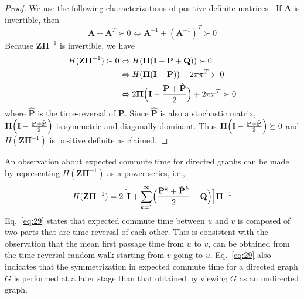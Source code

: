 \documentclass[10pt,twocolumn]{article}
\numberwithin{equation}{section}
\begin{document}
\begin{proof}
  We use the
  following characterizations of positive definite matrices
  \cite{boley09:_gener_laplac,horn94:_topic_in_matrix_analy}. If
  $\mathbf{A}$ is invertible, then
  \begin{equation}
    \label{eq:28}
    \mathbf{A} + \mathbf{A}^{T} \succ 0 \Leftrightarrow
    \mathbf{A}^{-1} + (\mathbf{A}^{-1})^{T} \succ 0
  \end{equation}
  Because $\mathbf{Z}\bm{\Pi}^{-1}$ is invertible, we have
  \begin{equation*}
    \begin{split}
      H(\mathbf{Z}\bm{\Pi}^{-1}) \succ 0
      & \Leftrightarrow H(\bm{\Pi}(\mathbf{I} - \mathbf{P} + \mathbf{Q})) \succ 0  \\
      & \Leftrightarrow H(\bm{\Pi}(\mathbf{I} - \mathbf{P})) + 2 \pi \pi^{T} \succ 0 \\
      & \Leftrightarrow 2 \bm{\Pi}\Bigl(\mathbf{I} - \frac{\mathbf{P}
        + \hat{\mathbf{P}}}{2}\Bigr) + 2\pi\pi^{T} \succ 0
   \end{split}
  \end{equation*}
  where $\hat{\mathbf{P}}$ is the time-reversal of $\mathbf{P}$. Since
  $\hat{\mathbf{P}}$ is also a stochastic matrix,
  $\bm{\Pi}\Bigl(\mathbf{I} - \tfrac{\mathbf{P} +
    \hat{\mathbf{P}}}{2}\Bigr)$ is symmetric and diagonally
  dominant. Thus $\bm{\Pi}\Bigl(\mathbf{I} - \tfrac{\mathbf{P} +
    \hat{\mathbf{P}}}{2}\Bigr) \succeq 0$ and
  $H(\mathbf{Z}\bm{\Pi}^{-1})$ is positive definite as claimed.
\end{proof}
An observation about expected commute time for directed graphs can
be made by representing $H(\mathbf{Z}\bm{\Pi}^{-1}
)$ as a power series, i.e., 
\begin{equation}
  \label{eq:29}
  H(\mathbf{Z}\bm{\Pi}^{-1}) = 
  2 \Bigl[ \mathbf{I} +
  \sum_{k=1}^{\infty}\Bigl(\frac{\mathbf{P}^{k} + \hat{\mathbf{P}}^{k}}{2}
  - \mathbf{Q}\Bigr)\Bigr] \bm{\Pi}^{-1}
\end{equation}
Eq.~\eqref{eq:29} states that expected commute time between $u$ and
$v$ is composed of two parts that are time-reversal of each
other. This is consistent with the observation that the mean first
passage time from $u$ to $v$, can be obtained from the time-reversal
random walk starting from $v$ going to $u$. Eq.~\eqref{eq:29} also
indicates that the symmetrization in expected commute time for a
directed graph $G$ is performed at a later stage than that obtained by
viewing $G$ as an undirected graph. 
\end{document}
